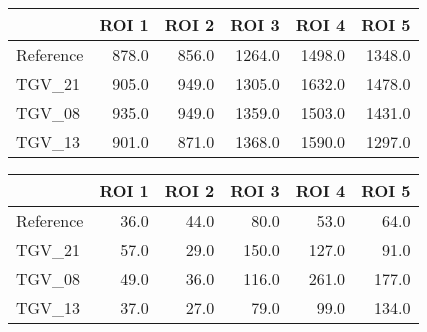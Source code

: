 \begin{tabular}{lrrrrr}
\toprule
{} &  ROI 1 &  ROI 2 &   ROI 3 &   ROI 4 &   ROI 5 \\
\midrule
Reference &  878.0 &  856.0 &  1264.0 &  1498.0 &  1348.0 \\
TGV\_21    &  905.0 &  949.0 &  1305.0 &  1632.0 &  1478.0 \\
TGV\_08    &  935.0 &  949.0 &  1359.0 &  1503.0 &  1431.0 \\
TGV\_13    &  901.0 &  871.0 &  1368.0 &  1590.0 &  1297.0 \\
\bottomrule
\end{tabular}
\begin{tabular}{lrrrrr}
\toprule
{} &  ROI 1 &  ROI 2 &  ROI 3 &  ROI 4 &  ROI 5 \\
\midrule
Reference &   36.0 &   44.0 &   80.0 &   53.0 &   64.0 \\
TGV\_21    &   57.0 &   29.0 &  150.0 &  127.0 &   91.0 \\
TGV\_08    &   49.0 &   36.0 &  116.0 &  261.0 &  177.0 \\
TGV\_13    &   37.0 &   27.0 &   79.0 &   99.0 &  134.0 \\
\bottomrule
\end{tabular}

